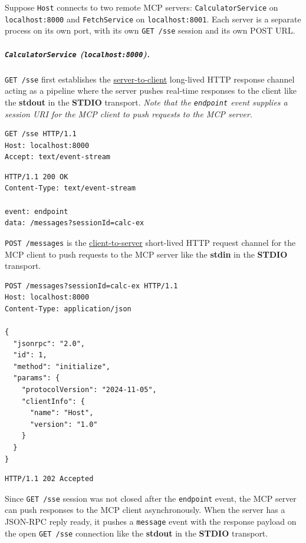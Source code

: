 Suppose \texttt{Host} connects to two remote MCP servers: \texttt{CalculatorService} on \texttt{localhost:8000} and \texttt{FetchService} on \texttt{localhost:8001}.
Each server is a separate process on its own port, with its own \texttt{GET /sse} session and its own POST URL.


\newpage


\subparagraph{\texttt{CalculatorService} (\texttt{localhost:8000}).}
\texttt{GET /sse} first establishes the \uline{server-to-client} long-lived HTTP response channel
acting as a pipeline where the server pushes real-time responses to the client like 
the \textbf{stdout} in the \textbf{STDIO} transport.
\textit{Note that the \texttt{endpoint} event supplies a session URI for the MCP client to push requests to the MCP server.}

\begin{httpexchange}
\begin{lstlisting}[style=http]
GET /sse HTTP/1.1
Host: localhost:8000
Accept: text/event-stream
\end{lstlisting}
\httpmidarrows
\begin{lstlisting}[style=http]
HTTP/1.1 200 OK
Content-Type: text/event-stream

event: endpoint
data: /messages?sessionId=calc-ex
\end{lstlisting}
\end{httpexchange}




\texttt{POST /messages} is the \uline{client-to-server} short-lived HTTP request channel 
for the MCP client to push requests to the MCP server like the \textbf{stdin} in the \textbf{STDIO} transport.

\begin{httpexchange}
\begin{lstlisting}[style=http]
POST /messages?sessionId=calc-ex HTTP/1.1
Host: localhost:8000
Content-Type: application/json

{
  "jsonrpc": "2.0",
  "id": 1,
  "method": "initialize",
  "params": {
    "protocolVersion": "2024-11-05",
    "clientInfo": {
      "name": "Host",
      "version": "1.0"
    }
  }
}
\end{lstlisting}
\httpmidarrows
\begin{lstlisting}[style=http]
HTTP/1.1 202 Accepted
\end{lstlisting}
\end{httpexchange}




Since \texttt{GET /sse} session was not closed after the \texttt{endpoint} event, the MCP server 
can push responses to the MCP client asynchronously.
When the server has a JSON-RPC reply ready, it pushes a \texttt{message} event with the response payload on the 
open \texttt{GET /sse} connection like the \textbf{stdout} in the \textbf{STDIO} transport.

